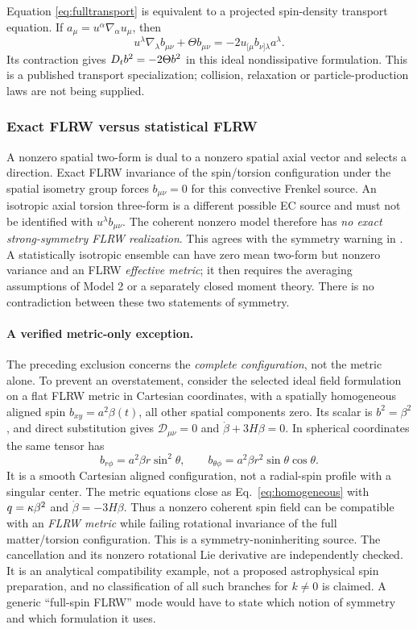 Equation \eqref{eq:fulltransport} is equivalent to a projected spin-density transport equation. If $a_\mu=u^\alpha\nabla_\alpha u_\mu$, then
\begin{equation}
 u^\lambda\nabla_\lambda b_{\mu\nu}+\Theta b_{\mu\nu}
 =-2u_{[\mu}b_{\nu]\lambda}a^\lambda.
\end{equation}
Its contraction gives $D_t b^2=-2\Theta b^2$ in this ideal nondissipative formulation. This is a published transport specialization; collision, relaxation or particle-production laws are not being supplied.

\subsubsection{Exact FLRW versus statistical FLRW}
A nonzero spatial two-form is dual to a nonzero spatial axial vector and selects a direction. Exact FLRW invariance of the spin/torsion configuration under the spatial isometry group forces $b_{\mu\nu}=0$ for this convective Frenkel source. An isotropic axial torsion three-form is a different possible EC source and must not be identified with $u^\lambda b_{\mu\nu}$. The coherent nonzero model therefore has \emph{no exact strong-symmetry FLRW realization}. This agrees with the symmetry warning in \cite{BB}. A statistically isotropic ensemble can have zero mean two-form but nonzero variance and an FLRW \emph{effective metric}; it then requires the averaging assumptions of Model 2 or a separately closed moment theory. There is no contradiction between these two statements of symmetry.

\paragraph{A verified metric-only exception.}
The preceding exclusion concerns the \emph{complete configuration}, not the metric alone. To prevent an overstatement, consider the selected ideal field formulation on a flat FLRW metric in Cartesian coordinates, with a spatially homogeneous aligned spin $b_{xy}=a^2\beta(t)$, all other spatial components zero. Its scalar is $b^2=\beta^2$, and direct substitution gives $\mathcal D_{\mu\nu}=0$ and $\dot\beta+3H\beta=0$. In spherical coordinates the same tensor has
\begin{equation}\label{eq:aligned}
 b_{r\phi}=a^2\beta r\sin^2\theta,\qquad
 b_{\theta\phi}=a^2\beta r^2\sin\theta\cos\theta.
\end{equation}
It is a smooth Cartesian aligned configuration, not a radial-spin profile with a singular center. The metric equations close as Eq.~\eqref{eq:homogeneous} with $q=\kappa\beta^2$ and $\dot\beta=-3H\beta$. Thus a nonzero coherent spin field can be compatible with an \emph{FLRW metric} while failing rotational invariance of the full matter/torsion configuration. This is a symmetry-noninheriting source. The cancellation and its nonzero rotational Lie derivative are independently checked. It is an analytical compatibility example, not a proposed astrophysical spin preparation, and no classification of all such branches for $k\ne0$ is claimed. A generic ``full-spin FLRW'' mode would have to state which notion of symmetry and which formulation it uses.

